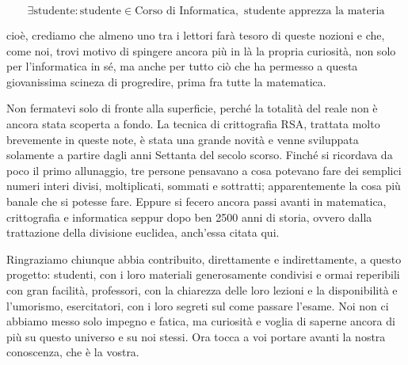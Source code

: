\[ \exists \text{studente}: \text{studente} \in \text{Corso di Informatica}, \text{ studente apprezza la materia} \]

\noindent cioè, crediamo che almeno uno tra i lettori farà tesoro di queste nozioni e che,
come noi, trovi motivo di spingere ancora più in là la propria curiosità, non solo per
l'informatica in sé, ma anche per tutto ciò che ha permesso a questa giovanissima scineza di
progredire, prima fra tutte la matematica.

Non fermatevi solo di fronte alla superficie, perché la totalità del reale non è ancora
stata scoperta a fondo. La tecnica di crittografia RSA, trattata molto brevemente in
queste note, è stata una grande novità e venne sviluppata solamente a partire dagli anni
Settanta del secolo scorso. Finché si ricordava da poco il primo allunaggio, tre persone
pensavano a cosa potevano fare dei semplici numeri interi divisi, moltiplicati, sommati
e sottratti; apparentemente la cosa più banale che si potesse fare. Eppure si fecero
ancora passi avanti in matematica, crittografia e informatica seppur dopo ben 2500 anni
di storia, ovvero dalla trattazione della divisione euclidea, anch'essa citata qui.

Ringraziamo chiunque abbia contribuito, direttamente e indirettamente, a questo progetto:
studenti, con i loro materiali generosamente condivisi e ormai reperibili con gran facilità,
professori, con la chiarezza delle loro lezioni e la disponibilità e l'umorismo, esercitatori,
con i loro segreti sul come passare l'esame. Noi non ci abbiamo messo solo impegno e fatica,
ma curiosità e voglia di saperne ancora di più su questo universo e su noi stessi. Ora tocca
a voi portare avanti la nostra conoscenza, che è la vostra.